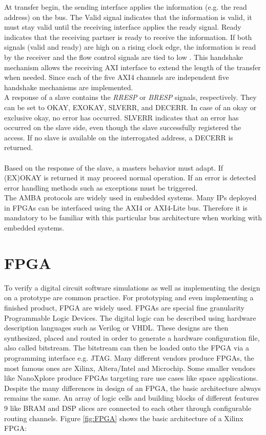 At transfer begin, the sending interface applies the information (e.g. the read address) on the bus. The Valid signal indicates that the information is valid, it must stay valid until the receiving interface applies the ready signal. Ready indicates that the receiving partner is ready to receive the information. If both signals (valid and ready) are high on a rising clock edge, the information is read by the receiver and the flow control signals are tied to low \cite{AMBA:AXI}. This handshake mechanism allows the receiving \ac{AXI} interface to extend the length of the transfer when needed. Since each of the five \ac{AXI}4 channels are independent five handshake mechanisms are implemented.\\
A response of a slave contains the \textit{RRESP} or \textit{BRESP} signals, respectively. They can be set to OKAY, EXOKAY, SLVERR, and DECERR. In case of an okay or exclusive okay, no error has occurred. SLVERR indicates that an error has occurred on the slave side, even though the slave successfully registered the access. If no slave is available on the interrogated address, a DECERR is returned.\\\\
Based on the response of the slave, a masters behavior must adapt. If (EX)OKAY is returned it may proceed normal operation. If an error is detected error handling methods such as exceptions must be triggered. \\
The \ac{AMBA} protocols are widely used in embedded systems. Many \acp{IP} deployed in \acp{FPGA} can be interfaced using the \ac{AXI}4 or \ac{AXI4-Lite} bus. Therefore it is mandatory to be familiar with this particular bus architecture when working with embedded systems.




\section{FPGA}
To verify a digital circuit software simulations as well as implementing the design on
a prototype are common practice. For prototyping and even implementing a finished
product, FPGA are widely used.
FPGAs are special fine granularity Programmable Logic Devices. The digital logic
can be described using hardware description languages such as Verilog or VHDL.
These designs are then synthesized, placed and routed in order to generate a
hardware configuration file, also called bitstream. The bitstream can then be loaded
onto the FPGA via a programming interface e.g. JTAG.
Many different vendors produce FPGAs, the most famous ones are Xilinx,
Altera/Intel and Microchip. Some smaller vendors like NanoXplore produce FPGAs
targeting rare use cases like space applications.
Despite the many differences in design of an FPGA, the basic architecture always
remains the same. An array of logic cells and building blocks of different features
9 like BRAM and DSP slices are connected to each other through configurable routing
channels.
Figure \ref{fig:FPGA} shows the basic architecture of a Xilinx FPGA:\\

